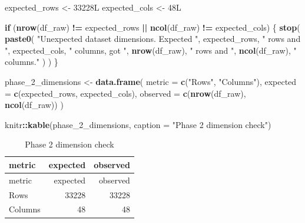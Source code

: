 \documentclass[
]{article}
\newenvironment{Shaded}{\begin{snugshade}}{\end{snugshade}}
\newcommand{\AttributeTok}[1]{\textcolor[rgb]{0.13,0.29,0.53}{#1}}
\newcommand{\ControlFlowTok}[1]{\textcolor[rgb]{0.13,0.29,0.53}{\textbf{#1}}}
\newcommand{\DataTypeTok}[1]{\textcolor[rgb]{0.13,0.29,0.53}{#1}}
\newcommand{\DecValTok}[1]{\textcolor[rgb]{0.00,0.00,0.81}{#1}}
\newcommand{\FunctionTok}[1]{\textcolor[rgb]{0.13,0.29,0.53}{\textbf{#1}}}
\newcommand{\NormalTok}[1]{#1}
\newcommand{\OtherTok}[1]{\textcolor[rgb]{0.56,0.35,0.01}{#1}}
\newcommand{\SpecialCharTok}[1]{\textcolor[rgb]{0.81,0.36,0.00}{\textbf{#1}}}
\newcommand{\StringTok}[1]{\textcolor[rgb]{0.31,0.60,0.02}{#1}}
\begin{document}
\begin{Shaded}
\begin{Highlighting}[]
\NormalTok{expected\_rows }\OtherTok{\textless{}{-}} \DecValTok{33228}\DataTypeTok{L}
\NormalTok{expected\_cols }\OtherTok{\textless{}{-}} \DecValTok{48}\DataTypeTok{L}

\ControlFlowTok{if}\NormalTok{ (}\FunctionTok{nrow}\NormalTok{(df\_raw) }\SpecialCharTok{!=}\NormalTok{ expected\_rows }\SpecialCharTok{||} \FunctionTok{ncol}\NormalTok{(df\_raw) }\SpecialCharTok{!=}\NormalTok{ expected\_cols) \{}
  \FunctionTok{stop}\NormalTok{(}
    \FunctionTok{paste0}\NormalTok{(}
      \StringTok{"Unexpected dataset dimensions. Expected "}\NormalTok{,}
\NormalTok{      expected\_rows, }\StringTok{" rows and "}\NormalTok{, expected\_cols, }\StringTok{" columns, got "}\NormalTok{,}
      \FunctionTok{nrow}\NormalTok{(df\_raw), }\StringTok{" rows and "}\NormalTok{, }\FunctionTok{ncol}\NormalTok{(df\_raw), }\StringTok{" columns."}
\NormalTok{    )}
\NormalTok{  )}
\NormalTok{\}}

\NormalTok{phase\_2\_dimensions }\OtherTok{\textless{}{-}} \FunctionTok{data.frame}\NormalTok{(}
  \AttributeTok{metric =} \FunctionTok{c}\NormalTok{(}\StringTok{"Rows"}\NormalTok{, }\StringTok{"Columns"}\NormalTok{),}
  \AttributeTok{expected =} \FunctionTok{c}\NormalTok{(expected\_rows, expected\_cols),}
  \AttributeTok{observed =} \FunctionTok{c}\NormalTok{(}\FunctionTok{nrow}\NormalTok{(df\_raw), }\FunctionTok{ncol}\NormalTok{(df\_raw))}
\NormalTok{)}

\NormalTok{knitr}\SpecialCharTok{::}\FunctionTok{kable}\NormalTok{(phase\_2\_dimensions, }\AttributeTok{caption =} \StringTok{"Phase 2 dimension check"}\NormalTok{)}
\end{Highlighting}
\end{Shaded}

\begin{longtable}[]{@{}lrr@{}}
\caption{Phase 2 dimension check}\tabularnewline
\toprule\noalign{}
metric & expected & observed \\
\midrule\noalign{}
\endfirsthead
\toprule\noalign{}
metric & expected & observed \\
\midrule\noalign{}
\endhead
\bottomrule\noalign{}
\endlastfoot
Rows & 33228 & 33228 \\
Columns & 48 & 48 \\
\end{longtable}
\end{document}

